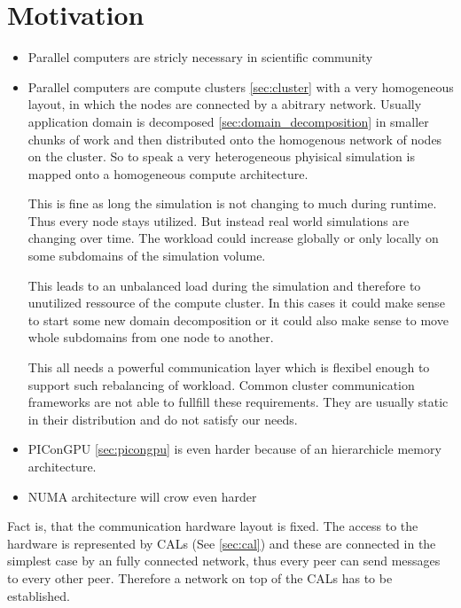 \section{Motivation}
\begin{itemize}
\item Parallel computers are stricly necessary in scientific community
\item Parallel computers are compute clusters
  \ref{sec:cluster} with a very homogeneous layout, in which the nodes
  are connected by a abitrary network.  Usually application domain is
  decomposed \ref{sec:domain_decomposition} in smaller chunks
  of work and then distributed onto the homogenous network of nodes on
  the cluster.  So to speak a very heterogeneous phyisical simulation
  is mapped onto a homogeneous compute architecture.

  This is fine as long the simulation is not changing to much during
  runtime. Thus every node stays utilized. But instead real world
  simulations are changing over time. The workload could increase
  globally or only locally on some subdomains of the simulation
  volume.

  This leads to an unbalanced load during the simulation and therefore
  to unutilized ressource of the compute cluster. In this cases it
  could make sense to start some new domain decomposition or it could
  also make sense to move whole subdomains from one node to another.

  This all needs a powerful communication layer which is flexibel
  enough to support such rebalancing of workload. Common cluster
  communication frameworks are not able to fullfill these
  requirements. They are usually static in their distribution and do
  not satisfy our needs.


\item PIConGPU \ref{sec:picongpu} is even harder because of an
  hierarchicle memory architecture.
\item NUMA architecture will crow even harder
\end{itemize}

Fact is, that the communication hardware layout is fixed. The access
to the hardware is represented by CALs (See \ref{sec:cal}) and these
are connected in the simplest case by an fully connected network, thus
every peer can send messages to every other peer. Therefore a network
on top of the CALs has to be established.

